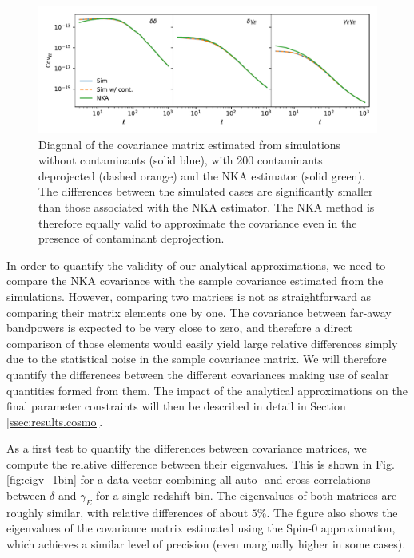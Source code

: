 \documentclass[a4paper,11pt]{article}
\begin{document}
      \begin{figure}
        \centering
        \includegraphics[width=\textwidth]{./figures/contaminants_diag_cov.pdf}
        \caption{Diagonal of the covariance matrix estimated from simulations without contaminants (solid blue), with 200 contaminants deprojected (dashed orange) and the NKA estimator (solid green). The differences between the simulated cases are significantly smaller than those associated with the NKA estimator. The NKA method is therefore equally valid to approximate the covariance even in the presence of contaminant deprojection.}
        \label{fig:diag_conts}
      \end{figure}
      In order to quantify the validity of our analytical approximations, we need to compare the NKA covariance with the sample covariance estimated from the simulations. However, comparing two matrices is not as straightforward as comparing their matrix elements one by one. The covariance between far-away bandpowers is expected to be very close to zero, and therefore a direct comparison of those elements would easily yield large relative differences simply due to the statistical noise in the sample covariance matrix. We will therefore quantify the differences between the different covariances making use of scalar quantities formed from them. The impact of the analytical approximations on the final parameter constraints will then be described in detail in Section \ref{ssec:results.cosmo}.
      
      As a first test to quantify the differences between covariance matrices, we compute the relative difference between their eigenvalues. This is shown in Fig. \ref{fig:eigv_1bin} for a data vector combining all auto- and cross-correlations between $\delta$ and $\gamma_E$ for a single redshift bin. The eigenvalues of both matrices are roughly similar, with relative differences of about $5\%$. The figure also shows the eigenvalues of the covariance matrix estimated using the Spin-0 approximation, which achieves a similar level of precision (even marginally higher in some cases).
\end{document}
